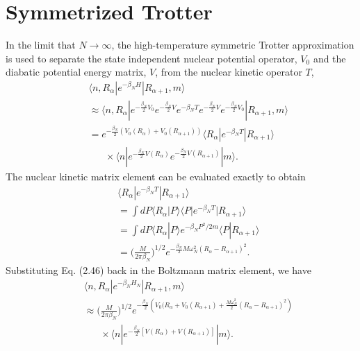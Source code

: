 \documentclass[phd,tocprelim]{cornell}
\begin{document}
\section{Symmetrized Trotter}
\label{app:sym_trot}
In the limit that $N\rightarrow
\infty$, the high-temperature symmetric Trotter 
approximation is used to 
separate the state independent nuclear 
potential operator, $V_0$ 
and the diabatic potential energy matrix, $V$, 
from the nuclear kinetic operator $T$,
\begin{eqnarray} 
&&
\langle
n, R_{\alpha} | e^{-\beta_N H} |
R_{\alpha+1}, m \rangle \\
\nonumber
\label{eq:trotter} 
&& \approx \langle n, R_{\alpha}
| e^{-\frac{\beta_N}{2} V_0 }e^{-
\frac{\beta_N}{2} V } e^{-\beta_N T }
e^{-\frac{\beta_N}{2} V }e^{-\frac{\beta_N}{2} V_0 } | R_{\alpha+1},
m\rangle \\
\nonumber
&&= e^{-
\frac{\beta_N}{2}(V_0(R_{\alpha}) +V_0(R_{\alpha+1}) )} 
\langle R_{\alpha} |
e^{-\beta_N T }| R_{\alpha+1}\rangle \\
\nonumber
&&\;\;\;\;\;\;\times
\langle n | e^{-\frac{ \beta_N}{2}
V(R_{\alpha}) }e^{-\frac{ \beta_N}{2}
V(R_{\alpha+1}) } | m\rangle.
\end{eqnarray} 
The nuclear kinetic matrix element
can be evaluated exactly to obtain
\begin{eqnarray} \label{eq:nuckinetic}
\nonumber
&&\langle R_{\alpha} |
e^{-\beta_N T }| R_{\alpha+1}\rangle\\
&& = \int dP \langle R_{\alpha} | P\rangle
\langle P | e^{-\beta_N T }|  R_{\alpha+1}\rangle \\
\nonumber
&& = \int dP \langle R_{\alpha} | P \rangle e^{-\beta_N P^2/2m} \langle P| R_{\alpha +1} \rangle \\
\nonumber
&&=
\bigg( \frac{M}{2 \pi \beta_N} \bigg)^{1/2} e^{-\frac{\beta_N}{2} M \omega_N^2
(R_{\alpha} -R_{\alpha+1})^2}.
\end{eqnarray}
Substituting Eq. (2.46) back in the 
Boltzmann matrix element, we have 
\begin{eqnarray} 
\label{eq:harmsprings}
\nonumber
&&\langle n, R_{\alpha} | e^{-\beta_N
H_N} | R_{\alpha+1}, m \rangle\\
\nonumber
&& \approx  \bigg(\frac{M}{2 \pi \beta_N} \bigg)^{1/2} e^{-\frac{\beta_N}{2} 
    \left( V_0(R_{\alpha}+V_0(R_{\alpha+1}) + \frac{M
\omega_N^2}{2} (R_{\alpha}
-R_{\alpha+1})^2\right)}\\
&&\;\;\;\;\;\; \times \langle n |
e^{-\frac{\beta_N}{2}[ V(R_{\alpha}) +
V(R_{\alpha+1}) ]} | m\rangle. 
 \end{eqnarray} 
 
\end{document}

